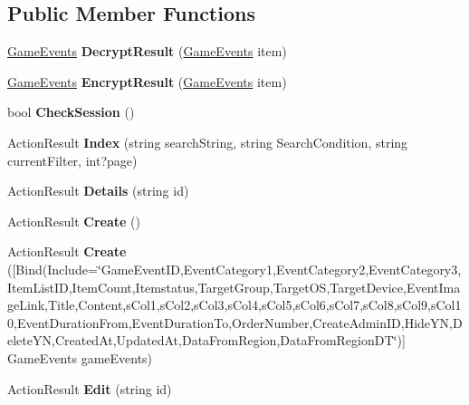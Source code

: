 \subsection*{Public Member Functions}
\begin{DoxyCompactItemize}
\item 
\hyperlink{a00083}{Game\+Events} {\bfseries Decrypt\+Result} (\hyperlink{a00083}{Game\+Events} item)\hypertarget{a00084_aa998d6457a3edb40fc2ac5eb3d7217bd}{}\label{a00084_aa998d6457a3edb40fc2ac5eb3d7217bd}

\item 
\hyperlink{a00083}{Game\+Events} {\bfseries Encrypt\+Result} (\hyperlink{a00083}{Game\+Events} item)\hypertarget{a00084_ae132069bf87b71cf7074deae4d1b381c}{}\label{a00084_ae132069bf87b71cf7074deae4d1b381c}

\item 
bool {\bfseries Check\+Session} ()\hypertarget{a00084_a6716950665e3ed8eef8addbc65413251}{}\label{a00084_a6716950665e3ed8eef8addbc65413251}

\item 
Action\+Result {\bfseries Index} (string search\+String, string Search\+Condition, string current\+Filter, int?page)\hypertarget{a00084_a5d2c29c4fad527acc40b52078e2eec07}{}\label{a00084_a5d2c29c4fad527acc40b52078e2eec07}

\item 
Action\+Result {\bfseries Details} (string id)\hypertarget{a00084_a8233163d3d36932f0c8b28940958aaf5}{}\label{a00084_a8233163d3d36932f0c8b28940958aaf5}

\item 
Action\+Result {\bfseries Create} ()\hypertarget{a00084_a623aedeac0dbef7fb7c8cf25208abeef}{}\label{a00084_a623aedeac0dbef7fb7c8cf25208abeef}

\item 
Action\+Result {\bfseries Create} (\mbox{[}Bind(Include=\char`\"{}Game\+Event\+ID,Event\+Category1,Event\+Category2,Event\+Category3,Item\+List\+ID,Item\+Count,Itemstatus,Target\+Group,Target\+OS,Target\+Device,Event\+Image\+Link,Title,Content,s\+Col1,s\+Col2,s\+Col3,s\+Col4,s\+Col5,s\+Col6,s\+Col7,s\+Col8,s\+Col9,s\+Col10,Event\+Duration\+From,Event\+Duration\+To,Order\+Number,Create\+Admin\+ID,Hide\+YN,Delete\+YN,Created\+At,Updated\+At,Data\+From\+Region,Data\+From\+Region\+DT\char`\"{})\mbox{]} Game\+Events game\+Events)\hypertarget{a00084_ac76e75b14047bcdb69cc784cbdfa5993}{}\label{a00084_ac76e75b14047bcdb69cc784cbdfa5993}

\item 
Action\+Result {\bfseries Edit} (string id)\hypertarget{a00084_a0b743baa7e1c50e34095856eb2eea3a9}{}\label{a00084_a0b743baa7e1c50e34095856eb2eea3a9}


\end{DoxyCompactItemize}
